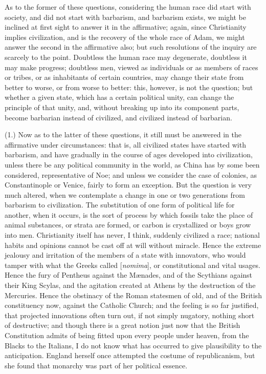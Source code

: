 As to the former of these
questions, considering the human race did start with society,
and did not start with barbarism, and barbarism exists, we might be
inclined at first sight to answer it in the affirmative; again, since
Christianity implies civilization, and is the recovery of the whole
race of Adam, we might answer the second in the affirmative also; but
such resolutions of the inquiry are scarcely to the point. Doubtless
the human race may degenerate, doubtless it may make progress;
doubtless men, viewed as individuals or as members of races or tribes,
or as inhabitants of certain countries, may change their state from
better to worse, or from worse to better: this, however, is not the
question; but whether a given state, which has a certain political
unity, can change the principle of that unity, and, without breaking
up into its component parts, become barbarian instead of civilized,
and civilized instead of barbarian.

(1.) Now as to the latter of
these questions, it still must be answered in the affirmative under
circumstances: that is, all civilized states have started with
barbarism, and have gradually in the course of ages developed into
civilization, unless there be any political community in the world, as
China has by some been considered, representative of Noe; and unless
we consider the case of colonies, as Constantinople or Venice, fairly
to form an exception. But the question is very much altered, when we
contemplate a change in one or two generations from barbarism to
civilization. The substitution of one form of political life for
another, when it occurs, is the sort of process by which fossils take
the place of animal substances, or strata are formed, or carbon is
crystallized or boys grow into men. Christianity itself has never, I
think, suddenly civilized a race; national habits and opinions cannot
be cast off at will without miracle. Hence the extreme jealousy
and irritation of the members of a state with innovators, who would
tamper with what the Greeks called [\emph{nomima}], or constitutional
and vital usages. Hence the fury of Pentheus against the Mænades, and
of the Scythians against their King Scylas, and the agitation created
at Athens by the destruction of the Mercuries. Hence the obstinacy of
the Roman statesmen of old, and of the British constituency now,
against the Catholic Church; and the feeling is so far justified, that
projected innovations often turn out, if not simply nugatory, nothing
short of destructive; and though there is a great notion just now that
the British Constitution admits of being fitted upon every people
under heaven, from the Blacks to the Italians, I do not know what has
occurred to give plausibility to the anticipation. England herself
once attempted the costume of republicanism, but she found that
monarchy was part of her political essence.

